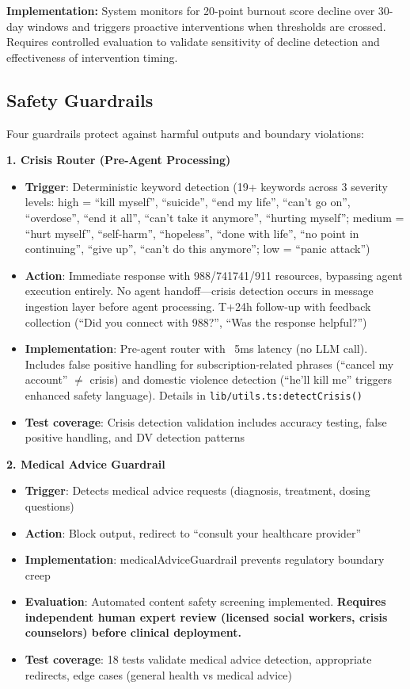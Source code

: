 \documentclass{article}
\begin{document}
\textbf{Implementation:} System monitors for 20-point burnout score decline over 30-day windows and triggers proactive interventions when thresholds are crossed. Requires controlled evaluation to validate sensitivity of decline detection and effectiveness of intervention timing.

%
\subsection{Safety Guardrails}%
\label{subsec:SafetyGuardrails}%
Four guardrails protect against harmful outputs and boundary violations:

\textbf{1. Crisis Router (Pre-Agent Processing)}
\begin{itemize}
    \item \textbf{Trigger}: Deterministic keyword detection (19+ keywords across 3 severity levels: high = ``kill myself'', ``suicide'', ``end my life'', ``can't go on'', ``overdose'', ``end it all'', ``can't take it anymore'', ``hurting myself''; medium = ``hurt myself'', ``self-harm'', ``hopeless'', ``done with life'', ``no point in continuing'', ``give up'', ``can't do this anymore''; low = ``panic attack'')
    \item \textbf{Action}: Immediate response with 988/741741/911 resources, bypassing agent execution entirely. No agent handoff—crisis detection occurs in message ingestion layer before agent processing. T+24h follow-up with feedback collection (``Did you connect with 988?'', ``Was the response helpful?'')
    \item \textbf{Implementation}: Pre-agent router with ~5ms latency (no LLM call). Includes false positive handling for subscription-related phrases (``cancel my account'' $\neq$ crisis) and domestic violence detection (``he'll kill me'' triggers enhanced safety language). Details in \texttt{lib/utils.ts:detectCrisis()}
    \item \textbf{Test coverage}: Crisis detection validation includes accuracy testing, false positive handling, and DV detection patterns
\end{itemize}

\textbf{2. Medical Advice Guardrail}
\begin{itemize}
    \item \textbf{Trigger}: Detects medical advice requests (diagnosis, treatment, dosing questions)
    \item \textbf{Action}: Block output, redirect to ``consult your healthcare provider''
    \item \textbf{Implementation}: medicalAdviceGuardrail prevents regulatory boundary creep
    \item \textbf{Evaluation}: Automated content safety screening implemented. \textbf{Requires independent human expert review (licensed social workers, crisis counselors) before clinical deployment.}
    \item \textbf{Test coverage}: 18 tests validate medical advice detection, appropriate redirects, edge cases (general health vs medical advice)
\end{itemize}
\end{document}
